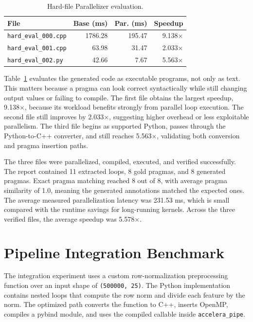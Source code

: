 \documentclass[12pt,a4paper,oneside]{report}
\begin{document}
\begin{table}[!htbp]
\centering
\caption{Hard-file Parallelizer evaluation.}
\label{tab:hard-eval}
\normalsize
\renewcommand{\arraystretch}{1.05}
\setlength{\tabcolsep}{6pt}
\begin{tabular}{lrrr}
\toprule
File & Base (ms) & Par. (ms) & Speedup \\
\midrule
\texttt{hard\_eval\_000.cpp} & 1786.28 & 195.47 & 9.138$\times$ \\
\texttt{hard\_eval\_001.cpp} & 63.98 & 31.47 & 2.033$\times$ \\
\texttt{hard\_eval\_002.py} & 42.66 & 7.67 & 5.563$\times$ \\
\bottomrule
\end{tabular}
\end{table}


Table~\ref{tab:hard-eval} evaluates the generated code as executable programs, not only as text.
This matters because a pragma can look correct syntactically while still changing output
values or failing to compile. The first file obtains the largest speedup, 9.138$\times$,
because its workload benefits strongly from parallel loop execution. The second file
still improves by 2.033$\times$, suggesting higher overhead or less exploitable
parallelism. The third file begins as supported Python, passes through the Python-to-C++
converter, and still reaches 5.563$\times$, validating both conversion and pragma
insertion paths.

The three files were parallelized, compiled, executed, and verified successfully. The
report contained 11 extracted loops, 8 gold pragmas, and 8 generated pragmas. Exact
pragma matching reached 8 out of 8, with average pragma similarity of 1.0, meaning the
generated annotations matched the expected ones. The average measured parallelization
latency was 231.53 ms, which is small compared with the runtime savings for long-running
kernels. Across the three verified files, the average speedup was 5.578$\times$.

\section{Pipeline Integration Benchmark}
The integration experiment uses a custom row-normalization preprocessing function over an input shape of \texttt{(500000, 25)}. The Python implementation contains nested loops that compute the row norm and divide each feature by the norm. The optimized path converts the function to C++, inserts OpenMP, compiles a pybind module, and uses the compiled callable inside \texttt{accelera\_pipe}.
\end{document}
